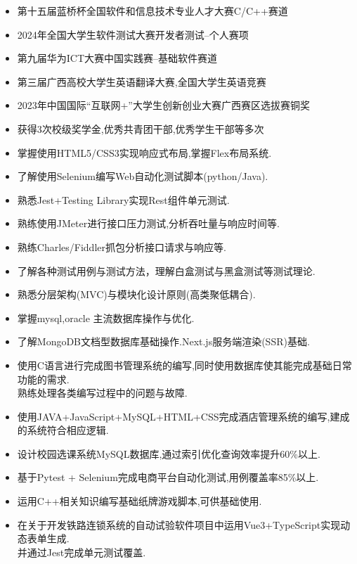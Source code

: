\documentclass[zh]{resume}
\begin{document}
\begin{itemize}
  \item 第十五届蓝桥杯全国软件和信息技术专业人才大赛C/C++赛道
  \item 2024年全国大学生软件测试大赛开发者测试--个人赛项
  \item 第九届华为ICT大赛中国实践赛--基础软件赛道
  \item 第三届广西高校大学生英语翻译大赛,全国大学生英语竞赛
  \item 2023年中国国际“互联网+”大学生创新创业大赛广西赛区选拔赛铜奖
  \item 获得3次校级奖学金,优秀共青团干部,优秀学生干部等多次
\end{itemize}
\begin{itemize}
  \item 掌握使用HTML5/CSS3实现响应式布局,掌握Flex布局系统.
  \item 了解使用Selenium编写Web自动化测试脚本(python/Java).
  \item 熟悉Jest+Testing Library实现Rest组件单元测试.
  \item 熟练使用JMeter进行接口压力测试,分析吞吐量与响应时间等.
  \item 熟练Charles/Fiddler抓包分析接口请求与响应等.
  \item 了解各种测试用例与测试方法，理解白盒测试与黑盒测试等测试理论.
  \item 熟悉分层架构(MVC)与模块化设计原则(高类聚低耦合).
  \item 掌握mysql,oracle 主流数据库操作与优化.
  \item 了解MongoDB文档型数据库基础操作.Next.js服务端渲染(SSR)基础.
\end{itemize}

\begin{itemize}
  \item 使用C语言进行完成图书管理系统的编写,同时使用数据库使其能完成基础日常功能的需求.\\ 熟练处理各类编写过程中的问题与故障. 
  \item 使用JAVA+JavaScript+MySQL+HTML+CSS完成酒店管理系统的编写,建成的系统符合相应逻辑.
  \item 设计校园选课系统MySQL数据库,通过索引优化查询效率提升60\%以上.
  \item 基于Pytest + Selenium完成电商平台自动化测试,用例覆盖率85\%以上.
  \item 运用C++相关知识编写基础纸牌游戏脚本,可供基础使用. 
  \item 在关于开发铁路连锁系统的自动试验软件项目中运用Vue3+TypeScript实现动态表单生成.\\ 并通过Jest完成单元测试覆盖.
\end{itemize}
\end{document}
